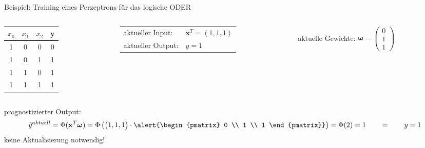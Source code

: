 \documentclass[11pt, aspectratio=169, t]{beamer}
\begin{document}
\begin{frame}{Beispiel: Training eines Perzeptrons für das logische ODER}
\begin{small}
\begin{columns}
\begin{column}{0.25\textwidth}
\hspace{0.5cm}
\begin{footnotesize}
\begin{tabular}{cccc} \toprule
$x_0$ & $x_1$ & $x_2$ & y \\ \midrule
1 & 0 & 0 & 0 \\
1 & 0 & 1 & 1 \\
1 & 1 & 0 & 1 \\
1 & 1 & 1 & 1 \\ \bottomrule
\end{tabular} \end{footnotesize}
\end{column}
\begin{column}{0.4\textwidth}
\begin{tabular}{ll}
aktueller Input: & $\mathbf{x}^{T} = (1, 1, 1)$ \\
aktueller Output: & $y=1$ \\
\end{tabular}
\end{column}
\begin{column}{0.4\textwidth}
aktuelle Gewichte: \alert{ $\boldsymbol{\omega} = \begin{pmatrix} 0 \\ 1 \\ 1 \end{pmatrix}$ }
\end{column}
\end{columns}
prognostizierter Output:
\[\hat{y}^{aktuell} = \Phi(\mathbf{x}^{T}\boldsymbol{\omega}) = \Phi\left( \begin{pmatrix} 1, 1, 1 \end{pmatrix}\cdot \alert{\begin{pmatrix} 0 \\ 1 \\ 1 \end{pmatrix}} \right) = \Phi(2) = 1 \qquad = \qquad y = 1\]
keine Aktualisierung notwendig!
\begin{align*} %
\phantom{\omega_0^{\text{neu}}} & \\
\phantom{\omega_1^{\text{neu}}} & \\
\phantom{\omega_2^{\text{neu}}} &
\end{align*}
\end{small}
\end{frame}
\end{document}
